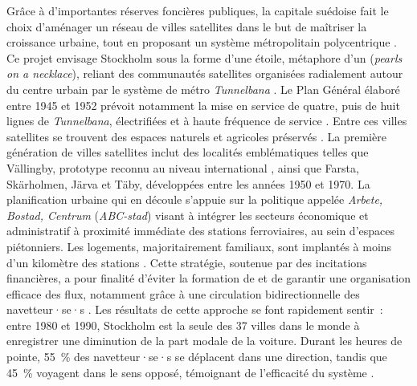 \begin{refsegment}
{    Grâce à d'importantes réserves foncières publiques, la capitale suédoise fait le choix d'aménager un réseau de villes satellites dans le but de maîtriser la croissance urbaine, tout en proposant un système métropolitain polycentrique \textcolor{blue}{\autocite[p.~109-130 (chapitre 4)]{cervero_transit_1998}}. Ce projet envisage Stockholm sous la forme d'une étoile, métaphore d'un  (\textsl{pearls on a necklace}), reliant des communautés satellites organisées radialement autour du centre urbain par le système de métro \textsl{Tunnelbana} \textcolor{blue}{\autocite[111]{pojani_past_2018}}. Le Plan Général élaboré entre 1945 et 1952 prévoit notamment la mise en service de quatre, puis de huit lignes de \textsl{Tunnelbana}, électrifiées et à haute fréquence de service \textcolor{blue}{\autocite[4]{knowles_transports_2020}}. Entre ces villes satellites se trouvent des espaces naturels et agricoles préservés \textcolor{blue}{\autocite[1-63]{strong_planned_1971}}. La première génération de villes satellites inclut des localités emblématiques telles que Vällingby, prototype reconnu au niveau international \textcolor{blue}{\autocite[23]{gullberg_city-building_2004}}, ainsi que Farsta, Skärholmen, Järva et Täby, développées entre les années 1950 et 1970. La planification urbaine qui en découle s'appuie sur la politique appelée \textsl{Arbete, Bostad, Centrum} (\textsl{ABC-stad}) visant à intégrer les secteurs économique et administratif à proximité immédiate des stations ferroviaires, au sein d'espaces piétonniers. Les logements, majoritairement familiaux, sont implantés à moins d'un kilomètre des stations \textcolor{blue}{\autocite[112]{pojani_past_2018}}. Cette stratégie, soutenue par des incitations financières, a pour finalité d'éviter la formation de  et de garantir une organisation efficace des flux, notamment grâce à une circulation bidirectionnelle des navetteur·se·s \textcolor{blue}{\autocites[43]{cervero_sustainable_1995}[22]{gullberg_city-building_2004}}. Les résultats de cette approche se font rapidement sentir~: entre 1980 et 1990, Stockholm est la seule des 37 villes dans le monde à enregistrer une diminution de la part modale de la voiture. Durant les heures de pointe, 55~\% des navetteur·se·s se déplacent dans une direction, tandis que 45~\% voyagent dans le sens opposé, témoignant de l'efficacité du système \textcolor{blue}{\autocites[705]{kenworthy_patterns_1999}[24]{curtis_transit_2009}}.
}
\end{refsegment}
